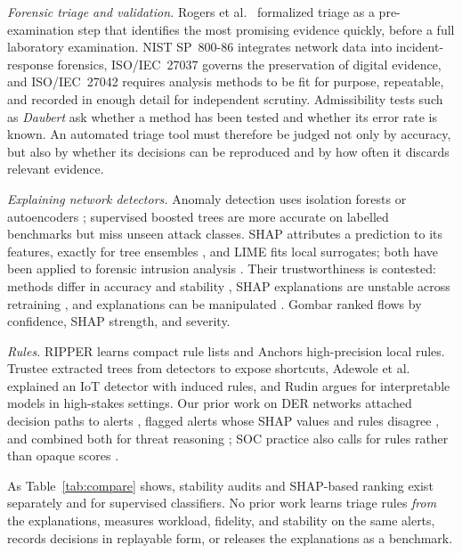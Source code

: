 \documentclass[journal]{IEEEtran}
\begin{document}
\emph{Forensic triage and validation.} Rogers et al.\ \cite{rogers} formalized triage as a pre-examination step that identifies the most promising evidence quickly, before a full laboratory examination. NIST SP~800-86 \cite{nist} integrates network data into incident-response forensics, ISO/IEC~27037 \cite{iso27037} governs the preservation of digital evidence, and ISO/IEC~27042 \cite{iso27042} requires analysis methods to be fit for purpose, repeatable, and recorded in enough detail for independent scrutiny. Admissibility tests such as \emph{Daubert} \cite{daubert} ask whether a method has been tested and whether its error rate is known. An automated triage tool must therefore be judged not only by accuracy, but also by whether its decisions can be reproduced and by how often it discards relevant evidence.

\emph{Explaining network detectors.} Anomaly detection uses isolation forests \cite{iforest} or autoencoders \cite{kitsune}; supervised boosted trees \cite{xgboost} are more accurate on labelled benchmarks but miss unseen attack classes. SHAP \cite{shap} attributes a prediction to its features, exactly for tree ensembles \cite{treeshap}, and LIME \cite{lime} fits local surrogates; both have been applied to forensic intrusion analysis \cite{hermosilla}. Their trustworthiness is contested: methods differ in accuracy and stability \cite{warnecke}, SHAP explanations are unstable across retraining \cite{maseno}, and explanations can be manipulated \cite{fooling}. Gombar \cite{gombar} ranked flows by confidence, SHAP strength, and severity.

\emph{Rules.} RIPPER \cite{ripper} learns compact rule lists and Anchors \cite{anchors} high-precision local rules. Trustee \cite{trustee} extracted trees from detectors to expose shortcuts, Adewole et al.\ \cite{adewole} explained an IoT detector with induced rules, and Rudin \cite{rudin} argues for interpretable models in high-stakes settings. Our prior work on DER networks attached decision paths to alerts \cite{cysider}, flagged alerts whose SHAP values and rules disagree \cite{excyder}, and combined both for threat reasoning \cite{cytrex}; SOC practice also calls for rules rather than opaque scores \cite{gridsoc}.

As Table~\ref{tab:compare} shows, stability audits \cite{maseno,warnecke} and SHAP-based ranking \cite{gombar} exist separately and for supervised classifiers. No prior work learns triage rules \emph{from} the explanations, measures workload, fidelity, and stability on the same alerts, records decisions in replayable form, or releases the explanations as a benchmark.
\end{document}
